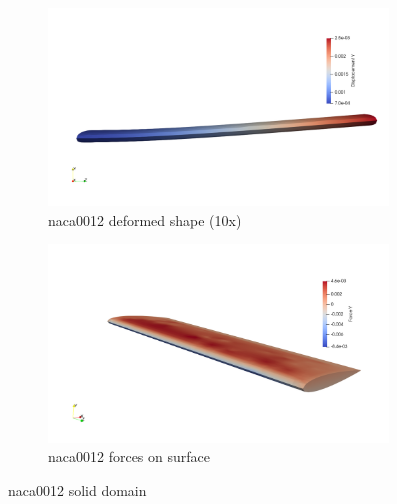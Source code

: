 \begin{figure}[htbp!]
	\centering
	\begin{subfigure}{.75\textwidth}
		\centering
	    \includegraphics[width=0.99\textwidth]{images/heathcote/naca0012_dy.png}
	    \caption{naca0012 deformed shape (10x)}
	    \label{fig:hc-wing-disp}
	\end{subfigure}
	\newline
	
	\centering
	\begin{subfigure}{.75\textwidth}
		\centering
    	\includegraphics[width=0.99\textwidth]{images/heathcote/naca0012_Fy.png}
    	\caption{naca0012 forces on surface}
    	\label{fig:hc-surf-forces}
	\end{subfigure}
	\caption{naca0012 solid domain}
	\label{fig:hc-solid-sol}
\end{figure}

